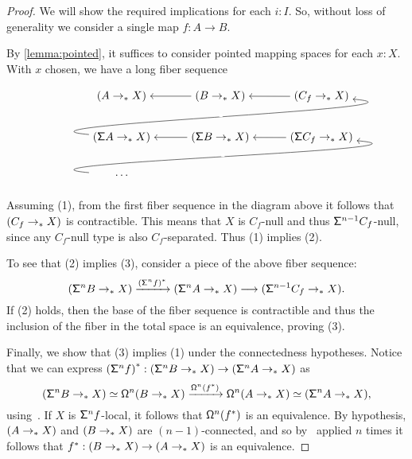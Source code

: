 \begin{proof}
We will show the required implications for each $i : I$.
So, without loss of generality we consider a single map $f : A \to B$.

By \cref{lemma:pointed}, it suffices to consider pointed mapping
spaces for each $x : X$.
With $x$ chosen, we have a long fiber sequence
\[
  \begin{tikzpicture}[descr/.style={fill=white,inner sep=1.5pt}]
        \matrix (m) [matrix of math nodes,row sep=2em,column sep=3em,minimum width=2em]
        {   &  (A\pto X) & {(B\pto X)} & (C_f \pto X) \\
            & (\suspsym A \pto X) & (\suspsym B \pto X)& (\suspsym C_f \pto X) \\
            & \hspace*{2em}\cdots\hspace*{2em} \\
        };

        \path[overlay,->, font=\scriptsize]
        (m-1-3) edge (m-1-2)
        (m-1-4) edge (m-1-3)
        (m-2-2) edge[out=175,in=355] node[descr,yshift=0.3ex]{}(m-1-4)
        (m-2-3) edge (m-2-2)
        (m-2-4) edge (m-2-3)
        (m-3-2) edge[out=175,in=355] node[descr,yshift=0.3ex] {} (m-2-4);
  \end{tikzpicture}
\]

Assuming (1), from the first fiber sequence in the diagram above
it follows that $(C_f \to_{\ast} X)$ is contractible. This means that $X$ is $C_f$-null and
thus $\mathsf{\Sigma}^{n-1} C_f$-null, since any $C_f$-null type is also $C_f$-separated. Thus (1) implies (2).

To see that (2) implies (3), consider a piece of the above fiber sequence:
\[
  (\mathsf{\Sigma}^{n} B \to_{\ast} X) \xrightarrow{{(\mathsf{\Sigma}^n f)}^\ast}
  (\mathsf{\Sigma}^n A\to_{\ast} X) \longrightarrow (\mathsf{\Sigma}^{n-1} C_f \to_{\ast} X).
\]
If (2) holds, then the base of the fiber sequence is contractible and thus the inclusion of the
fiber in the total space
is an equivalence, proving (3).

Finally, we show that (3) implies (1) under the connectedness hypotheses.
Notice that we can express
${(\mathsf{\Sigma}^{n} f)}^\ast : (\mathsf{\Sigma}^n B \to_{\ast} X) \to (\mathsf{\Sigma}^n A \to_{\ast} X)$ as
\[
    (\mathsf{\Sigma}^n B\to_{\ast} X) \simeq \mathsf{\Omega}^n(B \to_{\ast} X) \xrightarrow{\mathsf{\Omega}^n ({f}^\ast)}
    \mathsf{\Omega}^n(A \to_{\ast} X) \simeq (\mathsf{\Sigma}^n A \to_{\ast} X),
\]
using~\cite[Lemma~6.5.4]{hottbook}.
If $X$ is $\mathsf{\Sigma}^{n}f$-local, it follows that $\mathsf{\Omega}^n ({f}^\ast)$ is an equivalence.
By hypothesis, $(A\to_{\ast} X)$ and $(B\to_{\ast} X)$ are $(n-1)$-connected, and so by~\cite[Corollary~8.8.2]{hottbook} applied $n$ times
it follows that ${f}^\ast : (B \to_{\ast} X) \to (A \to_{\ast} X)$ is an equivalence.
\end{proof}

